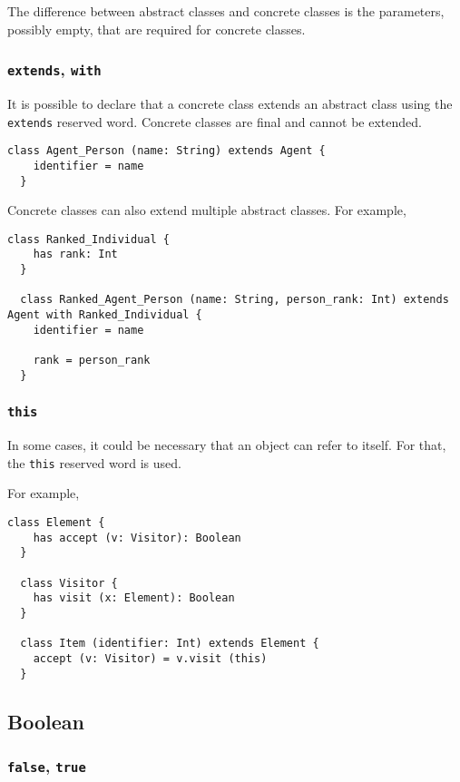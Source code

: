 \documentclass[12pt,a4paper]{article}
\newcommand{\srccode}[1]{\texttt{{#1}}}
\newcommand{\reservedWord}[1]{{\color{blue}\srccode{#1}}\xspace}
\newcommand{\sextends}{\reservedWord{extends}}
\newcommand{\swith}{\reservedWord{with}}
\newcommand{\sthis}{\reservedWord{this}}
\newcommand{\sfalse}{\reservedWord{false}}
\newcommand{\strue}{\reservedWord{true}}
\begin{document}
    The difference between abstract classes and concrete classes is the parameters, possibly empty, that are required for concrete classes.

    \subsubsection{\sextends, \swith}

    It is possible to declare that a concrete class extends an abstract class using the \sextends reserved word.
    Concrete classes are final and cannot be extended.

    \begin{lstlisting}[label={lst:exampleExtends}]
  class Agent_Person (name: String) extends Agent {
    identifier = name
  }
    \end{lstlisting}

    Concrete classes can also extend multiple abstract classes.
    For example,
    \begin{lstlisting}[label={lst:exampleWith}]
  class Ranked_Individual {
    has rank: Int
  }

  class Ranked_Agent_Person (name: String, person_rank: Int) extends Agent with Ranked_Individual {
    identifier = name

    rank = person_rank
  }
    \end{lstlisting}

    \subsubsection{\sthis}

    In some cases, it could be necessary that an object can refer to itself.
    For that, the \sthis reserved word is used.

    For example,
    \begin{lstlisting}[label={lst:exampleWith}]
  class Element {
    has accept (v: Visitor): Boolean
  }

  class Visitor {
    has visit (x: Element): Boolean
  }

  class Item (identifier: Int) extends Element {
    accept (v: Visitor) = v.visit (this)
  }
    \end{lstlisting}

    \subsection{Boolean}

    \subsubsection{\sfalse, \strue}
\end{document}
